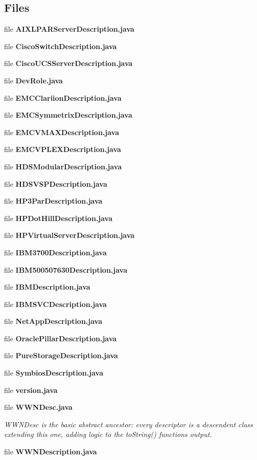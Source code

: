\subsection*{Files}
\begin{DoxyCompactItemize}
\item 
file {\bfseries A\+I\+X\+L\+P\+A\+R\+Server\+Description.\+java}
\item 
file {\bfseries Cisco\+Switch\+Description.\+java}
\item 
file {\bfseries Cisco\+U\+C\+S\+Server\+Description.\+java}
\item 
file {\bf Dev\+Role.\+java}
\item 
file {\bf E\+M\+C\+Clariion\+Description.\+java}
\item 
file {\bf E\+M\+C\+Symmetrix\+Description.\+java}
\item 
file {\bf E\+M\+C\+V\+M\+A\+X\+Description.\+java}
\item 
file {\bf E\+M\+C\+V\+P\+L\+E\+X\+Description.\+java}
\item 
file {\bf H\+D\+S\+Modular\+Description.\+java}
\item 
file {\bf H\+D\+S\+V\+S\+P\+Description.\+java}
\item 
file {\bf H\+P3\+Par\+Description.\+java}
\item 
file {\bf H\+P\+Dot\+Hill\+Description.\+java}
\item 
file {\bfseries H\+P\+Virtual\+Server\+Description.\+java}
\item 
file {\bf I\+B\+M3700\+Description.\+java}
\item 
file {\bf I\+B\+M500507630\+Description.\+java}
\item 
file {\bf I\+B\+M\+Description.\+java}
\item 
file {\bf I\+B\+M\+S\+V\+C\+Description.\+java}
\item 
file {\bf Net\+App\+Description.\+java}
\item 
file {\bf Oracle\+Pillar\+Description.\+java}
\item 
file {\bfseries Pure\+Storage\+Description.\+java}
\item 
file {\bf Symbios\+Description.\+java}
\item 
file {\bf version.\+java}
\item 
file {\bf W\+W\+N\+Desc.\+java}
\begin{DoxyCompactList}\small\item\em W\+W\+N\+Desc is the basic abstract ancestor\+: every descriptor is a descendent class extending this one, adding logic to the to\+String() function\textquotesingle{}s output. \end{DoxyCompactList}\item 
file {\bf W\+W\+N\+Description.\+java}
\end{DoxyCompactItemize}
